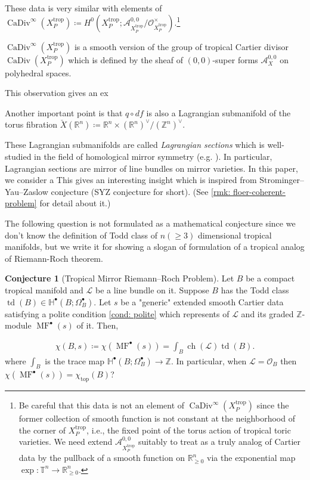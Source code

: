 \documentclass[a4paper,dvipdfmx,reqno,12pt]{amsart}
\theoremstyle{definition}
\newtheorem{Conj}[Thm]{Conjecture}
\newcommand{\deq}{\coloneqq}
\newcommand{\R}{\mathbb{R}}%
\newcommand{\Z}{\mathbb{Z}}%
\newcommand{\mb}[1]{\mathbb{#1}}%
\newcommand{\mcal}[1]{\mathcal{#1}}%
\newcommand{\opn}[1]{\operatorname{#1}}
\numberwithin{equation}{section}
\begin{document}
These data is very similar with elements of 
$\opn{CaDiv}^{\infty}(X_{P}^{\opn{trop}})\deq H^{0}(X_{P}^{\opn{trop}};
\mcal{A}^{0,0}_{X_{P}^{\opn{trop}}}/
\mathcal{O}^{\times}_{X_{P}^{\opn{trop}}})$.\footnote{
Be careful that this data is not an element
of $\opn{CaDiv}^{\infty}(X_{P}^{\opn{trop}})$ since
 the former collection of smooth function is not constant
at the neighborhood of the corner of $X_{P}^{\opn{trop}}$,
i.e., the fixed point of the torus action of tropical 
toric varieties.
We need extend $\mcal{A}^{0,0}_{X_{P}^{\opn{trop}}}$
suitably to treat as a truly analog of Cartier data by
the pullback of a smooth function on $\R_{\geq 0}^{n}$ via 
the exponential map $\opn{exp}\colon \mb{T}^{n}\to \R_{\geq 0}^{n}$.}



$\opn{CaDiv}^{\infty}(X_{P}^{\opn{trop}})$ is a
smooth version of the group of tropical Cartier divisor
$\opn{CaDiv}(X_{P}^{\opn{trop}})$ 
\cite[Definition 4.2]{jellLefschetzTheoremTropical2018a}
which is defined by the sheaf of $(0,0)$-super forms 
$\mcal{A}^{0,0}_X$ on 
polyhedral spaces.

This observation gives an ex

Another important point is that $q\circ df$ is also a Lagrangian
submanifold of the torus fibration $\check{X}(\R^{n})\deq \R^{n}\times (\R^{n})^{\vee}/(\Z^{n})^{\vee}$.


These Lagrangian submanifolds are called
\emph{Lagrangian sections} 
which is well-studied in the field of homological 
mirror symmetry 
(e.g. \cite{MR1882331}).
In particular, Lagrangian sections are mirror of line bundles on
mirror varieties. 
In this paper, we consider a 
This gives an interesting insight which is inspired from
Strominger--Yau--Zaslow conjecture 
(SYZ conjecture for short).
(See \cref{rmk: floer-coherent-problem} 
for detail about it.)

The following question is not formulated as a mathematical 
conjecture since we don't know the definition of Todd 
class of $n(\geq 3)$ dimensional tropical manifolds,
but we write it for showing a slogan of formulation 
of a tropical analog of Riemann-Roch theorem.

\begin{Conj}[{Tropical Mirror Riemann--Roch Problem}]
Let $B$ be a compact tropical manifold and $\mcal{L}$
be a line bundle on it. Suppose $B$ has the Todd class
$\opn{td}(B) \in \mb{H}^{\bullet}(B;\Omega_B^{\bullet})$.
 Let $s$ be a "generic"
extended smooth Cartier data satisfying a polite condition 
\cref{cond: polite} which represents of $\mcal{L}$
and its graded $\Z$-module $\opn{MF}^{\bullet}(s)$
of it. Then,

\begin{align}
\chi(B,s)  \deq \chi(\opn{MF}^{\bullet}(s))=\int_B \opn{ch}(\mcal{L})\opn{td}(B).
\end{align}
where $\int_B$ is the trace map $\mb{H}^{\bullet}(B;\Omega_B^{\bullet})\to \Z$.
In particular, when $\mcal{L}=\mcal{O}_B$ then
$\chi(\opn{MF}^{\bullet}(s))=\chi_{\opn{top}}(B)$?
\end{Conj}
\end{document}
